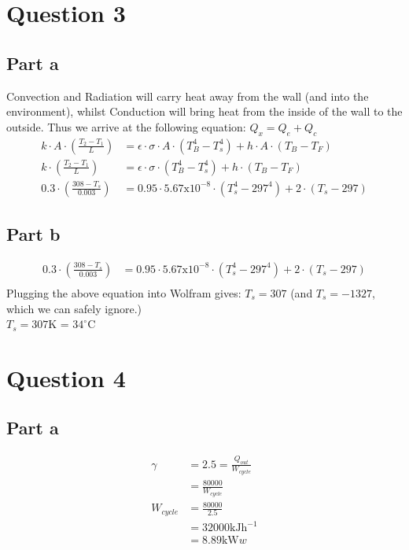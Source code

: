 \section{Question 3}
\subsection{Part a}
Convection and Radiation will carry heat away from the wall (and into the environment), whilst Conduction will bring heat from the inside of the wall to the outside. Thus we arrive at the following equation: $Q_x = Q_e + Q_c$
\begin{equation*}
    \begin{split}
        k \cdot A \cdot \left(\frac{T_2 - T_1}{L}\right) & = \epsilon \cdot \sigma \cdot A \cdot (T_B^4 - T_s^4) + h \cdot A \cdot (T_B - T_F) \\
        k \cdot \left(\frac{T_2 - T_1}{L}\right) & = \epsilon \cdot \sigma \cdot  (T_B^4 - T_s^4) + h \cdot (T_B - T_F) \\
        0.3 \cdot \left(\frac{308 - T_s}{0.003}\right) & = 0.95 \cdot 5.67\text{x}10^{-8} \cdot (T_s^4 - 297^4) + 2 \cdot (T_s - 297)
    \end{split}
\end{equation*}
\subsection{Part b}
\begin{equation*}
    \begin{split}
        0.3 \cdot \left(\frac{308 - T_s}{0.003}\right) & = 0.95 \cdot 5.67\text{x}10^{-8} \cdot (T_s^4 - 297^4) + 2 \cdot (T_s - 297) \\
    \end{split}
\end{equation*}
Plugging the above equation into Wolfram gives: $T_s = 307$ (and $T_s = -1327$, which we can safely ignore.) \\
$T_s = 307$K = $34^\circ$C
\section{Question 4}
\subsection{Part a}
\begin{equation*}
    \begin{split}
        \gamma & = 2.5 = \frac{Q_{out}}{W_{cycle}} \\
        & = \frac{80000}{W_{cycle}} \\
        W_{cycle} & = \frac{80000}{2.5} \\
        & = 32000 \text{kJh}^{-1} \\
        & = 8.89 \text{kW}
w    \end{split}
\end{equation*}
